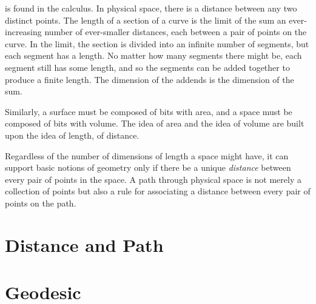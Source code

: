 \documentclass[nobib]{tufte-book}
\begin{document}
 is found in the calculus.  In physical
space, there is a distance between any two distinct points.  The length of a
section of a curve is the limit of the sum an ever-increasing number of
ever-smaller distances, each between a pair of points on the curve.  In the
limit, the section is divided into an infinite number of segments, but each
segment has a length.  No matter how many segments there might be, each segment
still has some length, and so the segments can be added together to produce a
finite length.  The dimension of the addends is the dimension of the sum.

Similarly, a surface must be composed of bits with area, and a space must be
composed of bits with volume.  The idea of area and the idea of volume are
built upon the idea of length, of distance.

Regardless of the number of dimensions of length a space might have, it can
support basic notions of geometry only if there be a unique \emph{distance}
between every pair of points in the space.  A path through physical space is
not merely a collection of points but also a rule for associating a distance
between every pair of points on the path.

\section{Distance and Path}

\section{Geodesic}

\appendix

\backmatter






\printindex
\end{document}
